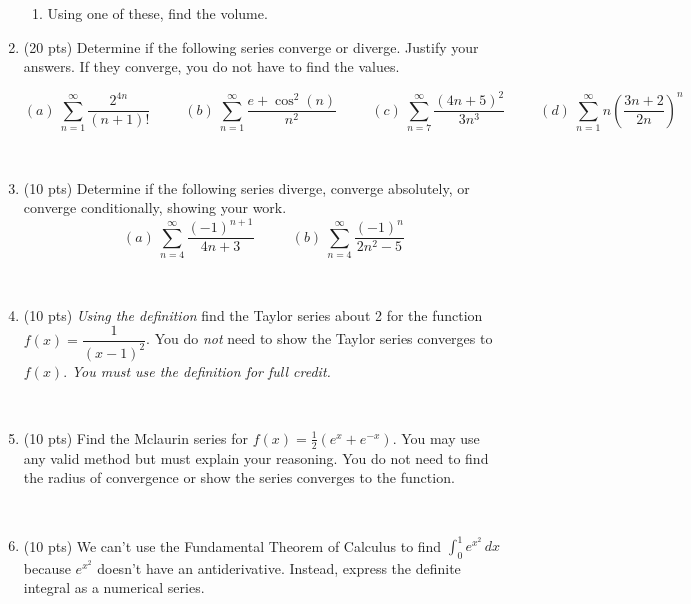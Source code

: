\documentclass[12pt, oneside]{article}   	%
\begin{document}
\begin{enumerate}
\begin{enumerate}
\item Using one of these, find the volume.
\end{enumerate}


\item (20 pts) Determine if the following series converge or diverge. Justify your answers. If they converge, you do not have to find the values. 

$$(a)  \ \sum_{n=1}^{\infty} \dfrac{2^{4n}}{(n+1)!}  \ \ \ \ \ \ \ \ \ \ \ (b) \ \sum_{n=1}^\infty \dfrac{e+\cos^2(n)}{n^2}  \ \ \ \ \ \ \ \ \ \ \ (c) \ \sum_{n=7}^{\infty} \dfrac{(4n+5)^2}{3n^3}  \ \ \ \ \ \ \ \ \ \ \ (d) \ \sum_{n=1}^{\infty} n \left(\dfrac{3n+2}{2n} \right)^n$$

\

\item (10 pts)  Determine if the following series diverge, converge absolutely, or converge conditionally, showing your work.
$$(a)  \ \sum_{n=4}^{\infty}  \dfrac{(-1)^{n+1}}{4n+3}  \ \ \ \ \ \ \ \ \ \ \ \  (b) \ \sum_{n=4}^{\infty}  \dfrac{(-1)^n}{2n^2-5}$$

\
\item (10 pts)
 \emph{Using the definition} find the Taylor series about 2 for the function $f(x)=\dfrac{1}{(x-1)^2}$. You do \emph{not} need to show the Taylor series converges to $f(x)$. \emph{You must use the definition for full credit.}

\


\item (10 pts) Find the Mclaurin series for $f(x)= \frac{1}{2}(e^x+e^{-x})$. You may use any valid method but must explain your reasoning. You do not need to find the radius of convergence or show the series converges to the function.

\

\item (10 pts) We can't use the Fundamental Theorem of Calculus to find $\int_0^1 e^{x^2} \, dx$ because $e^{x^2}$ doesn't have an antiderivative. Instead, express the definite integral as a numerical series. 


\end{enumerate}
\end{document}
